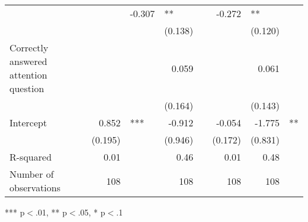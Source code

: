 \documentclass{article}
\begin{document}
\begin{table}[!h]
\begin{tabular}{llllllll}
  \multicolumn{1}{r}{} &
  \multicolumn{1}{l}{} &
  \multicolumn{1}{r}{-0.307} &
  \multicolumn{1}{l}{**} &
  \multicolumn{1}{r}{} &
  \multicolumn{1}{r}{-0.272} &
  \multicolumn{1}{l}{**} \\
\multicolumn{1}{l}{} &
  \multicolumn{1}{r}{} &
  \multicolumn{1}{l}{} &
  \multicolumn{1}{r}{(0.138)} &
  \multicolumn{1}{l}{} &
  \multicolumn{1}{r}{} &
  \multicolumn{1}{r}{(0.120)} &
  \multicolumn{1}{l}{} \\
\multicolumn{1}{l}{Correctly answered attention question} &
  \multicolumn{1}{r}{} &
  \multicolumn{1}{l}{} &
  \multicolumn{1}{r}{0.059} &
  \multicolumn{1}{l}{} &
  \multicolumn{1}{r}{} &
  \multicolumn{1}{r}{0.061} &
  \multicolumn{1}{l}{} \\
\multicolumn{1}{l}{} &
  \multicolumn{1}{r}{} &
  \multicolumn{1}{l}{} &
  \multicolumn{1}{r}{(0.164)} &
  \multicolumn{1}{l}{} &
  \multicolumn{1}{r}{} &
  \multicolumn{1}{r}{(0.143)} &
  \multicolumn{1}{l}{} \\
\multicolumn{1}{l}{Intercept} &
  \multicolumn{1}{r}{0.852} &
  \multicolumn{1}{l}{***} &
  \multicolumn{1}{r}{-0.912} &
  \multicolumn{1}{l}{} &
  \multicolumn{1}{r}{-0.054} &
  \multicolumn{1}{r}{-1.775} &
  \multicolumn{1}{l}{**} \\
\multicolumn{1}{l}{} &
  \multicolumn{1}{r}{(0.195)} &
  \multicolumn{1}{l}{} &
  \multicolumn{1}{r}{(0.946)} &
  \multicolumn{1}{l}{} &
  \multicolumn{1}{r}{(0.172)} &
  \multicolumn{1}{r}{(0.831)} &
  \multicolumn{1}{l}{} \\
\multicolumn{1}{l}{R-squared} &
  \multicolumn{1}{r}{0.01} &
  \multicolumn{1}{l}{} &
  \multicolumn{1}{r}{0.46} &
  \multicolumn{1}{l}{} &
  \multicolumn{1}{r}{0.01} &
  \multicolumn{1}{r}{0.48} &
  \multicolumn{1}{l}{} \\
\multicolumn{1}{l}{Number of observations} &
  \multicolumn{1}{r}{108} &
  \multicolumn{1}{l}{} &
  \multicolumn{1}{r}{108} &
  \multicolumn{1}{l}{} &
  \multicolumn{1}{r}{108} &
  \multicolumn{1}{r}{108} &
  \multicolumn{1}{l}{} \\
\cline{1-8}
\end{tabular}

\footnotesize{
*** p$<$.01, ** p$<$.05, * p$<$.1
}
\end{table}
\end{document}

